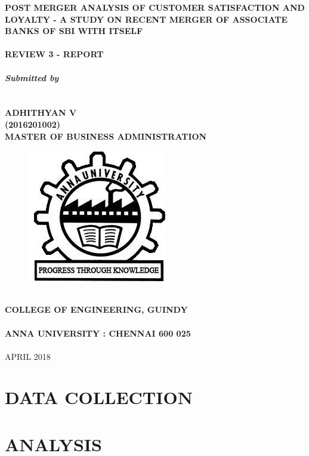 \documentclass[a4paper, 14pt]{article}
\newcommand\tab[1][1cm]{\hspace*{#1}}
\begin{document}
\selectfont
{
\begin{center}	
\textbf{\fontsize{18}{2} \selectfont POST MERGER ANALYSIS OF CUSTOMER SATISFACTION AND LOYALTY - A STUDY ON RECENT MERGER OF ASSOCIATE BANKS OF SBI WITH ITSELF}\\
\tab \\
\textbf{\fontsize{14}{2} \selectfont REVIEW 3 - REPORT}\\
\tab \\
\textbf{\fontsize{14}{2} \selectfont \emph{Submitted by}}\\
\tab \\
\tab \\
{\fontsize{16}{2} \selectfont
\textbf{ADHITHYAN V}}\\
{\fontsize{16}{2} \selectfont \textbf{(2016201002)}}\\

\textbf{\fontsize{16}{2} \selectfont MASTER OF BUSINESS ADMINISTRATION}\\
\begin{figure}[H]
\centering
\includegraphics[scale=0.5]{anna_univ_logo.jpg}
\end{figure}
\tab \\
\textbf{\fontsize{14}{2} \selectfont COLLEGE OF ENGINEERING, GUINDY}\\
\tab \\
\textbf{\fontsize{16}{2} \selectfont ANNA UNIVERSITY : CHENNAI 600 025}\\
\tab \\
{\fontsize{14}{2} \selectfont APRIL 2018}\\
\end{center}
\newpage
\section*{DATA COLLECTION}
\section*{ANALYSIS}
}
\end{document}
